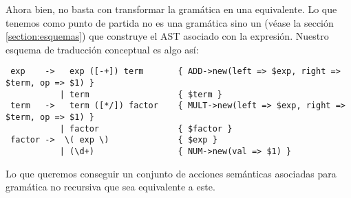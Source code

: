 Ahora bien, no basta con transformar la gramática en una equivalente.
Lo que tenemos como punto de partida no es una gramática sino un 
(véase la sección 
\ref{section:esquemas})
que construye el AST asociado con la expresión.
Nuestro esquema de traducción conceptual es algo así:
\begin{verbatim}
 exp    ->   exp ([-+]) term       { ADD->new(left => $exp, right => $term, op => $1) }
           | term                  { $term }
 term   ->   term ([*/]) factor    { MULT->new(left => $exp, right => $term, op => $1) } 
           | factor                { $factor }
 factor ->  \( exp \)              { $exp }
           | (\d+)                 { NUM->new(val => $1) }
\end{verbatim}

Lo que queremos conseguir un conjunto de acciones semánticas
asociadas para gramática no recursiva que sea equivalente 
a este.

